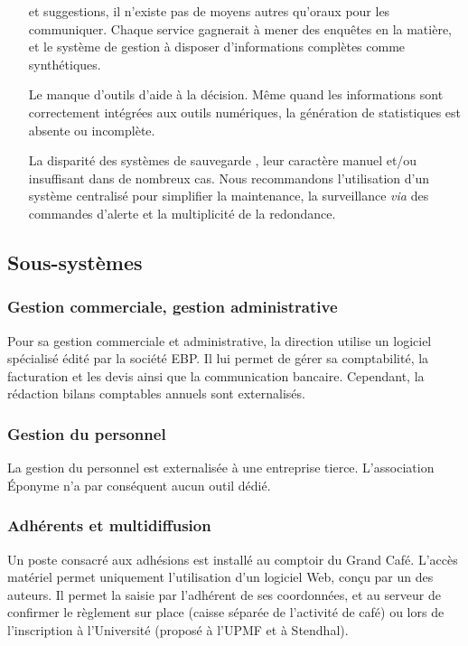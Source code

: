 \begin{enumerate}
      et suggestions, il n'existe pas de moyens autres qu'oraux pour les communiquer.
      Chaque service gagnerait à mener des enquêtes en la matière, et le système de gestion
      à disposer d'informations complètes comme synthétiques.
\item[Le manque d'outils d'aide à la décision.] Même quand les informations sont correctement
      intégrées aux outils numériques, la génération de statistiques est absente ou
      incomplète.
\item[La disparité des systèmes de sauvegarde], leur caractère manuel et/ou insuffisant
      dans de nombreux cas.
      Nous recommandons l'utilisation d'un système centralisé pour simplifier la maintenance,
      la surveillance \textit{via} des commandes d'alerte et la multiplicité de la redondance.
\end{enumerate}

\subsection{Sous-systèmes}

\subsubsection{Gestion commerciale, gestion administrative}

Pour sa gestion commerciale et administrative, la direction utilise un logiciel spécialisé
 édité par la société EBP.
Il lui permet de gérer sa comptabilité, la facturation et les devis ainsi que la
communication bancaire. Cependant, la rédaction bilans comptables annuels sont externalisés.

\subsubsection{Gestion du personnel}

La gestion du personnel est externalisée à une entreprise tierce.
L'association Éponyme n'a par conséquent aucun outil dédié.

\subsubsection{Adhérents et multidiffusion}
\label{multidiffusion}

Un poste consacré aux adhésions est installé au comptoir du Grand Café.
L'accès matériel permet uniquement l'utilisation d'un logiciel Web, conçu par un des auteurs.
Il permet la saisie par l'adhérent de ses coordonnées, et au serveur de confirmer
le règlement sur place (caisse séparée de l'activité de café) ou lors de l'inscription
à l'Université (proposé à l'UPMF et à Stendhal).

